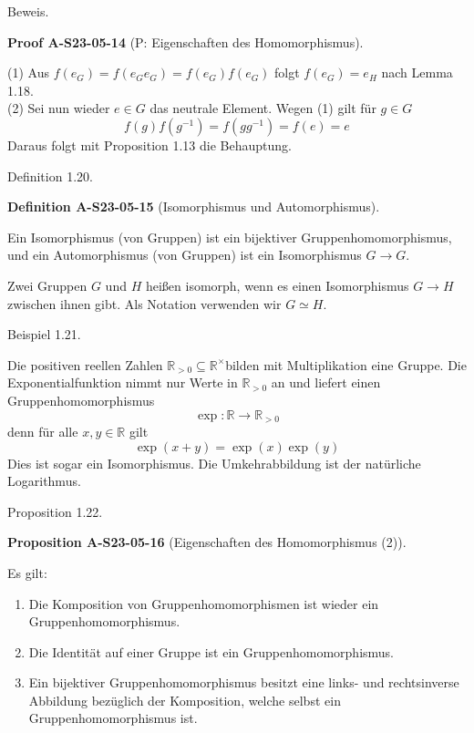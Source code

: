 \documentclass[10pt, letterpaper]{article}
\newcommand{\CustomHeading}[3]{%
  \par\medskip\noindent%
  \textbf{#1 #2} \textnormal{(#3)}.\enskip%
}
\newenvironment{DEF}[2]{\begin{unitbox}\CustomHeading{Definition}{#1}{#2}}{\end{unitbox}}
\newenvironment{PROP}[2]{\begin{unitbox}\CustomHeading{Proposition}{#1}{#2}}{\end{unitbox}}
\newenvironment{PROOF}[2]{\begin{unitbox}\CustomHeading{Proof}{#1}{#2}}{\end{unitbox}}
\begin{document}
Beweis. 

\begin{PROOF}{A-S23-05-14}{P: Eigenschaften des Homomorphismus}
(1) Aus $f\left(e_{G}\right)=f\left(e_{G} e_{G}\right)=f\left(e_{G}\right) f\left(e_{G}\right)$ folgt $f\left(e_{G}\right)=e_{H}$ nach Lemma 1.18.\\


(2) Sei nun wieder $e \in G$ das neutrale Element. Wegen (1) gilt für $g \in G$
$$
f(g) f\left(g^{-1}\right)=f\left(g g^{-1}\right)=f(e)=e
$$
Daraus folgt mit Proposition 1.13 die Behauptung.
\end{PROOF}


Definition 1.20. 


\begin{DEF}{A-S23-05-15}{Isomorphismus und Automorphismus}
Ein Isomorphismus (von Gruppen) ist ein bijektiver Gruppenhomomorphismus, und ein Automorphismus (von Gruppen) ist ein Isomorphismus $G \rightarrow G$.

Zwei Gruppen $G$ und $H$ heißen isomorph, wenn es einen Isomorphismus $G \rightarrow H$ zwischen ihnen gibt. Als Notation verwenden wir $G \simeq H$.
\end{DEF}



Beispiel 1.21. 


Die positiven reellen Zahlen $\mathbb{R}_{>0} \subseteq \mathbb{R}^{\times}$bilden mit Multiplikation eine Gruppe. Die Exponentialfunktion nimmt nur Werte in $\mathbb{R}_{>0}$ an und liefert einen Gruppenhomomorphismus
$$
\exp : \mathbb{R} \rightarrow \mathbb{R}_{>0}
$$
denn für alle $x, y \in \mathbb{R}$ gilt
$$
\exp (x+y)=\exp (x) \exp (y)
$$
Dies ist sogar ein Isomorphismus. Die Umkehrabbildung ist der natürliche Logarithmus.


Proposition 1.22. 

\begin{PROP}{A-S23-05-16}{Eigenschaften des Homomorphismus (2)}
Es gilt:
\begin{enumerate}
  \item Die Komposition von Gruppenhomomorphismen ist wieder ein Gruppenhomomorphismus.

  \item Die Identität auf einer Gruppe ist ein Gruppenhomomorphismus.

  \item Ein bijektiver Gruppenhomomorphismus besitzt eine links- und rechtsinverse Abbildung bezüglich der Komposition, welche selbst ein Gruppenhomomorphismus ist.
\end{enumerate}
\end{PROP}
\end{document}
